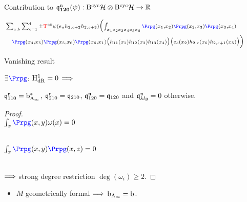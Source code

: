 \documentclass[xcolor=dvipsnames]{beamer}
\providecommand{\MainFolder}{.}
\providecommand{\GraphicsFolder}{\MainFolder/Graphics}
\theoremstyle{plain}
\begin{document}
\begin{frame}[fragile]{Contribution to $\mathbf{\mathfrak{q}_{120}^{\mathfrak{n}}(\psi): \mathrm{B}^{\mathrm{cyc}} \mathcal{H} \otimes \mathrm{B}^{\mathrm{cyc}}\mathcal{H} \rightarrow \mathbb{R}}$}
\begin{center}
\let\OldPrpg\Prpg
\renewcommand{\Prpg}{{\color{blue}\OldPrpg}}
$\begin{multlined}
\scriptstyle \sum_{a,b}\sum_{c=1}^4 \pm  {\color{red}\mathrm{T}}^{ab} \psi(e_a  h_{2,c+2}  h_{2,c+3})  \Bigl(\int_{x_1 x_2 x_3 x_4 x_5 x_6} \Prpg(x_1,x_2)\Prpg(x_2,x_3)\Prpg(x_3,x_4)\\
\scriptstyle\Prpg(x_4,x_5)\Prpg(x_5,x_6)\Prpg(x_6,x_1)\bigl( h_{11}(x_1) h_{12}(x_3)
h_{13}(x_4)\bigr)\bigl(e_b(x_2)  h_{2,c}(x_6)  h_{2,c+1}(x_5)\bigr)\Bigr)
\end{multlined}$
\let\Prpg\OldPrpg
\end{center}
\end{frame}

\begin{frame}{Vanishing result}
\begin{theorem}
$\exists{\color{blue}\Prpg}$: $\mathrm{H}_{\mathrm{dR}}^1=0$ $\Longrightarrow$ \parbox[t]{7cm}{$\mathfrak{q}_{110}^{\mathfrak{n}} = \mathrm{b}_{\mathrm{A}_\infty}^*$, $\mathfrak{q}_{210}^{\mathfrak{n}}=\mathfrak{q}_{210}$, $\mathfrak{q}_{120}^{\mathfrak{n}} = \mathfrak{q}_{120}$ and $\mathfrak{q}_{klg}^{\mathfrak{n}} = 0$ otherwise.}
\end{theorem}\pause
\begin{proof}
\parbox[b]{5cm}{\centering
\\
$\int_x {\color{blue}\Prpg}(x,y)\omega(x) = 0$
}
\parbox[b]{5cm}{\centering
 \\
$\int_x {\color{blue}\Prpg}(x,y){\color{blue}\Prpg}(x,z) = 0$
} \\[.3cm]
$\Longrightarrow$ strong degree restriction $\deg(\omega_i)\ge 2$. \qedhere
\end{proof}\pause
\vspace{.3cm}
\begin{itemize}
\item $M$ geometrically formal $\Longrightarrow$ $\mathrm{b}_{\mathrm{A}_\infty} = \mathrm{b}$.
\end{itemize}

\end{frame}
\end{document}
